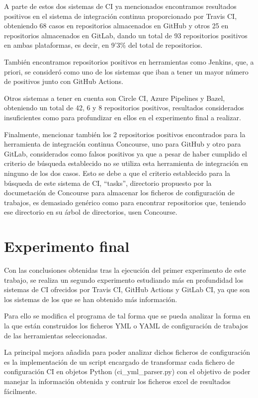 A parte de estos dos sistemas de CI ya mencionados encontramos resultados positivos en el sistema de integración continua proporcionado por Travis CI, obteniendo 68 casos en repositorios almacenados en GitHub y otros 25 en repositorios almacenados en GitLab, dando un total de 93 repositorios positivos en ambas plataformas, es decir, en 9'3\% del total de repositorios.

También encontramos repositorios positivos en herramientas como Jenkins, que, a priori, se consideró como uno de los sistemas que iban a tener un mayor número de positivos junto con GitHub Actions.

Otros sistemas a tener en cuenta son Circle CI, Azure Pipelines y Bazel, obteniendo un total de 42, 6 y 8 repositorios positivos, resultados considerados insuficientes como para profundizar en ellos en el experimento final a realizar.

Finalmente, mencionar también los 2 repositorios positivos encontrados para la herramienta de integración continua Concourse, uno para GitHub y otro para GitLab, considerados como falsos positivos ya que a pesar de haber cumplido el criterio de búsqueda establecido no se utiliza esta herramienta de integración en ninguno de los dos casos. Esto se debe a que el criterio establecido para la búsqueda de este sistema de CI, ``tasks'', directorio propuesto por la documetación de Concourse para almacenar los ficheros de configuración de trabajos, es demasiado genérico como para encontrar repositorios que, teniendo ese directorio en su árbol de directorios, usen Concourse.

\section{Experimento final}
Con las conclusiones obtenidas tras la ejecución del primer experimento de este trabajo, se realiza un segundo experimento estudiando más en profundidad los sistemas de CI ofrecidos por Travis CI, GitHub Actions y GitLab CI, ya que son los sistemas de los que se han obtenido más información.

Para ello se modifica el programa de tal forma que se pueda analizar la forma en la que están construidos los ficheros YML o YAML de configuración de trabajos de las herramientas seleccionadas.

La principal mejora añadida para poder analizar dichos ficheros de configuración es la implementación de un script encargado de transformar cada fichero de configuración CI en objetos Python (ci\_yml\_parser.py) con el objetivo de poder manejar la información obtenida y contruir los ficheros excel de resultados fácilmente.

